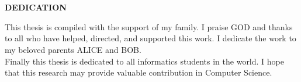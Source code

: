 \chapter*{}
\vspace*{-1.0cm}
\begin{center}
\normalfont\LARGE\textbf{DEDICATION}
\end{center}
\begin{center}
This thesis is compiled with the support of my family. I praise GOD and thanks to all who have helped, directed, and supported this work. I dedicate the work to my beloved parents ALICE and BOB.\\
Finally this thesis is dedicated to all informatics students in the world. I hope that this research may provide valuable contribution in Computer Science.
\end{center} 
